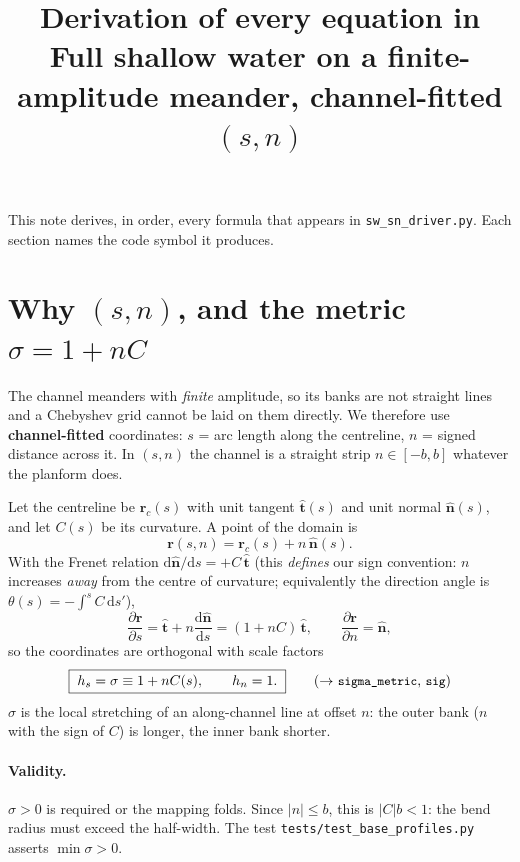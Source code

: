 \documentclass[11pt]{article}
\title{\bf Derivation of every equation in \code{sw\_sn\_driver.py}\\
\large Full shallow water on a finite-amplitude meander, channel-fitted $(s,n)$}
\author{\code{numerical/dedalus\_meander\_full\_SW}}
\date{}
\newcommand{\code}[1]{\texttt{\small #1}}
\begin{document}
\maketitle
\vspace{-8mm}

\noindent This note derives, in order, every formula that appears in
\code{sw\_sn\_driver.py}. Each section names the code symbol it produces.

\tableofcontents

\section{Why $(s,n)$, and the metric $\sigma=1+nC$}
\label{sec:metric}

The channel meanders with \emph{finite} amplitude, so its banks are not straight
lines and a Chebyshev grid cannot be laid on them directly. We therefore use
\textbf{channel-fitted} coordinates: $s$ = arc length along the centreline,
$n$ = signed distance across it. In $(s,n)$ the channel is a straight strip
$n\in[-b,b]$ whatever the planform does.

Let the centreline be $\bm r_c(s)$ with unit tangent $\hat{\bm t}(s)$ and unit
normal $\hat{\bm n}(s)$, and let $C(s)$ be its curvature. A point of the domain is
\begin{equation}
  \bm r(s,n)=\bm r_c(s)+n\,\hat{\bm n}(s).
\end{equation}
With the Frenet relation $\mathrm d\hat{\bm n}/\mathrm ds=+C\,\hat{\bm t}$
(this \emph{defines} our sign convention: $n$ increases \emph{away} from the centre
of curvature; equivalently the direction angle is $\theta(s)=-\int^s C\,\mathrm ds'$),
\begin{equation}
  \frac{\partial\bm r}{\partial s}=\hat{\bm t}+n\frac{\mathrm d\hat{\bm n}}{\mathrm ds}
  =(1+nC)\,\hat{\bm t},
  \qquad
  \frac{\partial\bm r}{\partial n}=\hat{\bm n},
\end{equation}
so the coordinates are orthogonal with scale factors
\begin{equation}
  \boxed{\;h_s=\sigma\equiv 1+nC(s),\qquad h_n=1.\;}
  \tag{$\to$ \code{sigma\_metric}, \code{sig}}
\end{equation}
$\sigma$ is the local stretching of an along-channel line at offset $n$: the outer
bank ($n$ with the sign of $C$) is longer, the inner bank shorter.

\paragraph{Validity.} $\sigma>0$ is required or the mapping folds. Since
$|n|\le b$, this is $|C|b<1$: the bend radius must exceed the half-width. The test
\code{tests/test\_base\_profiles.py} asserts $\min\sigma>0$.
\end{document}

